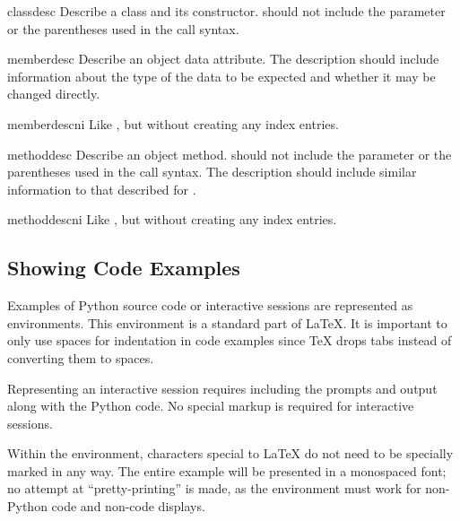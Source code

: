 \documentclass{howto}
\begin{document}
    \begin{envdesc}{classdesc}{}
      Describe a class and its constructor.   should not include the  parameter or
      the parentheses used in the call syntax.
    \end{envdesc}

    \begin{envdesc}{memberdesc}{}
      Describe an object data attribute.  The description should
      include information about the type of the data to be expected
      and whether it may be changed directly.
    \end{envdesc}
    \begin{envdesc}{memberdescni}{}
      Like , but without creating any index entries.
    \end{envdesc}

    \begin{envdesc}{methoddesc}{}
      Describe an object method.   should not include
      the  parameter or the parentheses used in the call
      syntax.  The description should include similar information to
      that described for .
    \end{envdesc}
    \begin{envdesc}{methoddescni}{}
      Like , but without creating any index entries.
    \end{envdesc}


  \subsection{Showing Code Examples}

    Examples of Python source code or interactive sessions are
    represented as  environments.  This environment
    is a standard part of \LaTeX{}.  It is important to only use
    spaces for indentation in code examples since \TeX{} drops tabs
    instead of converting them to spaces.

    Representing an interactive session requires including the prompts
    and output along with the Python code.  No special markup is
    required for interactive sessions.

    Within the  environment, characters special to
    \LaTeX{} do not need to be specially marked in any way.  The entire
    example will be presented in a monospaced font; no attempt at
    ``pretty-printing'' is made, as the environment must work for
    non-Python code and non-code displays.
\end{document}
